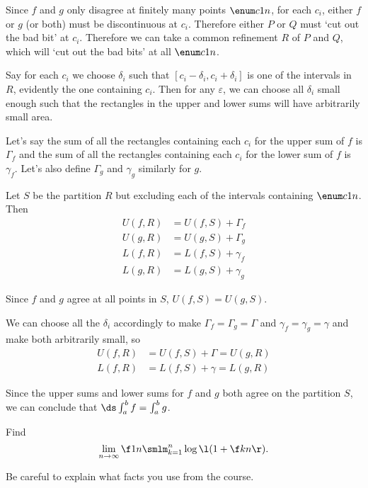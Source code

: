 \documentclass[a4paper]{article}
\begin{document}
Since $f$ and $g$ only disagree at finitely many points $\enum c1n$, for each $c_i$, either $f$ or $g$ (or both) must be discontinuous at $c_i$. Therefore either $P$ or $Q$ must \enquote*{cut out the bad bit} at $c_i$. Therefore we can take a common refinement $R$ of $P$ and $Q$, which will \enquote*{cut out the bad bits} at all $\enum c1n$.

Say for each $c_i$ we choose $\delta_i$ such that $[c_i - \delta_i, c_i + \delta_i]$ is one of the intervals in $R$, evidently the one containing $c_i$. Then for any $\varepsilon$, we can choose all $\delta_i$ small enough such that the rectangles in the upper and lower sums will have arbitrarily small area.

Let's say the sum of all the rectangles containing each $c_i$ for the upper sum of $f$ is $\Gamma_f$ and the sum of all the rectangles containing each $c_i$ for the lower sum of $f$ is $\gamma_f$. Let's also define $\Gamma_g$ and $\gamma_g$ similarly for $g$.

Let $S$ be the partition $R$ but excluding each of the intervals containing $\enum c1n$. Then \begin{align*}
U(f, R) &= U(f, S) + \Gamma_f\\
U(g, R) &= U(g, S) + \Gamma_g\\
L(f, R) &= L(f, S) + \gamma_f\\
L(g, R) &= L(g, S) + \gamma_g
\end{align*}

Since $f$ and $g$ agree at all points in $S$, $U(f, S) = U(g, S)$.

We can choose all the $\delta_i$ accordingly to make $\Gamma_f = \Gamma_g = \Gamma$ and $\gamma_f = \gamma_g = \gamma$ and make both arbitrarily small, so \begin{align*}
U(f, R) &= U(f, S) + \Gamma = U(g, R)\\
L(f, R) &= L(f, S) + \gamma = L(g, R)
\end{align*}

Since the upper sums and lower sums for $f$ and $g$ both agree on the partition $S$, we can conclude that $\ds \int_a^b f = \int_a^b g$.



\begin{questionbody}
Find \[
\lim_{n \to \infty} \f1n \smlm_{k=1}^n \log \l( 1 + \f kn \r).
\]

Be careful to explain what facts you use from the course.
\end{questionbody}
\end{document}
